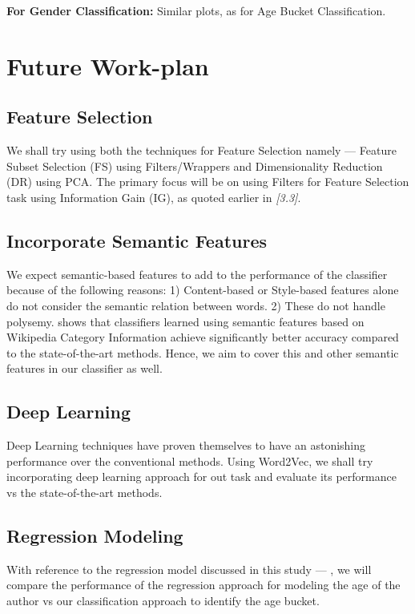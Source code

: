 \documentclass{sig-alternate}
\begin{document}
\textbf{For Gender Classification:}
Similar plots, as for Age Bucket Classification.\\
\section{Future Work-plan}
\subsection{Feature Selection}
We shall try using both the techniques for Feature Selection namely --- Feature Subset Selection (FS) using Filters/Wrappers and Dimensionality Reduction (DR) using PCA. The primary focus will be on using Filters for Feature Selection task using Information Gain (IG), as quoted earlier in \textit{[3.3]}.
\subsection{Incorporate Semantic Features}
We expect semantic-based features to add to the performance of the classifier because of the following reasons: 1) Content-based or Style-based features alone do not consider the semantic relation between words. 2) These do not handle polysemy. \cite{iiit_god} shows that classifiers learned using semantic features based on Wikipedia Category Information achieve significantly better accuracy compared to the state-of-the-art methods. Hence, we aim to cover this and other semantic features in our classifier as well.
\subsection{Deep Learning}
Deep Learning techniques have proven themselves to have an astonishing performance over the conventional methods. Using Word2Vec, we shall try incorporating deep learning approach for out task and evaluate its performance vs the state-of-the-art methods.
\subsection{Regression Modeling}
With reference to the regression model discussed in this study --- \cite{cmu}, we will compare the performance of the regression approach for modeling the age of the author vs our classification approach to identify the age bucket. 
\end{document}

